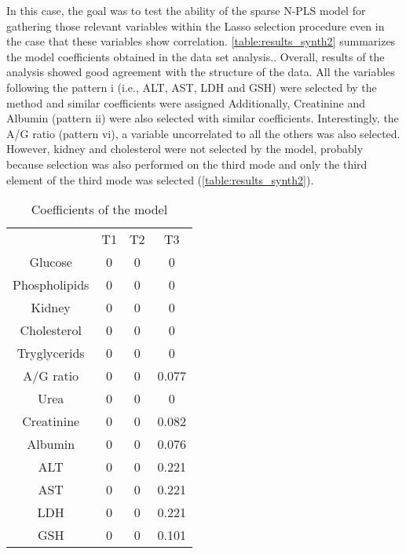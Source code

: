 In this case, the goal was to test the ability of the sparse N-PLS model for gathering those relevant variables within the Lasso selection procedure even in the case that these variables show correlation. \autoref{table:results_synth2} summarizes the model coefficients obtained in the data set analysis.. Overall, results of the analysis showed good agreement with the structure of the data. All the variables  following the pattern i (i.e., ALT, AST, LDH and GSH) were selected by the method and similar coefficients  were assigned Additionally, Creatinine and Albumin (pattern ii) were also selected with similar coefficients. Interestingly,  the A/G ratio (pattern vi), a variable uncorrelated to all the others was also selected. However, kidney and cholesterol were not selected by the model, probably because selection was also performed on the third mode and only the third element of the third mode was selected (\autoref{table:results_synth2}).

\begin{table}[!h]
\begin{tabular}{ |c|c|c|c| } 
 \hline
 \  & T1 & T2 & T3 \\ 
 Glucose & 0 & 0 & 0 \\ 
 Phospholipids & 0 & 0 & 0 \\ 
 Kidney & 0 & 0 & 0 \\ 
 Cholesterol & 0 & 0 & 0 \\ 
 Tryglycerids & 0 & 0 & 0 \\ 
 A/G ratio & 0 & 0 & 0.077 \\ 
 Urea & 0 & 0 & 0 \\ 
 Creatinine & 0 & 0 & 0.082 \\ 
 Albumin & 0 & 0 & 0.076 \\ 
 ALT & 0 & 0 & 0.221 \\ 
 AST & 0 & 0 & 0.221 \\ 
 LDH & 0 & 0 & 0.221 \\ 
 GSH & 0 & 0 & 0.101 \\ 
 \hline
\end{tabular}
\caption{Coefficients of the model}
\label{table:results_synth2}
\end{table}

